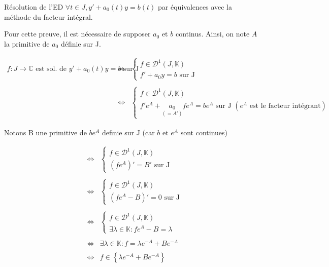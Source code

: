 \documentclass{article}
\date{10 novembre 2023}
\begin{document}
\maketitle

\begin{question_kholle}{Résolution de l'ED  $\forall t \in J, y' + a_{0}(t)y = b(t)$ par équivalences avec la méthode du facteur intégral.}
	
	Pour cette preuve, il est nécessaire de supposer $a_{0}$ et $b$ continus.
	Ainsi, on note $A$ la primitive de $a_{0}$ définie sur J. 
  
  	$$\begin{array}{ccl}
  	f : J \to \mathbb{C} \text{ est sol. de } y' + a_{0}(t) y = b \text{ sur J} 
  	& \iff & \left\{ \begin{array}{l}
  		f \in \mathcal{D}^1 (J, \mathbb{K}) \\
  		f' + a_{0}y = b \text{ sur J }
  	\end{array}  \right.                                                                                \\\\
  	& \iff & \left\{ \begin{array}{l}
  		f \in \mathcal{D}^1 (J, \mathbb{K}) \\
  		f'  e^A + \underset{(= A')}{a_{0}} f  e^A = b  e^A \text{ sur J } (e^A \text{ est le facteur intégrant})
  	\end{array}\right.        
  \end{array} $$
  
  Notons B une primitive de $be^A$ definie sur J (car $b$ et $e^A$ sont continues)
  
  $$\begin{array}{ccl}  	
   & \iff &  \left\{ \begin{array}{l}
  			f \in \mathcal{D}^1 (J, \mathbb{K}) \\
  			(fe^A)' = B' \text{ sur J}
  	\end{array} \right. \\\\
  	 & \iff &  \left\{ \begin{array}{l}
  		f \in \mathcal{D}^1 (J, \mathbb{K}) \\
  		(fe^A - B)' = 0 \text{ sur J}
  	\end{array} \right. \\\\
   & \iff &  \left\{ \begin{array}{l}
  	f \in \mathcal{D}^1 (J, \mathbb{K}) \\
  	\exists \lambda \in \mathbb{K} : fe^A - B = \lambda
  \end{array} \right. \\\\
  & \iff & \exists \lambda \in \mathbb{K} : f = \lambda e^{-A} + B e^{-A} \\\\
  & \iff & f \in \left\lbrace \lambda e^{-A} + B e^{-A} \right\rbrace 
  \end{array} $$
  

\end{question_kholle}
\end{document}
